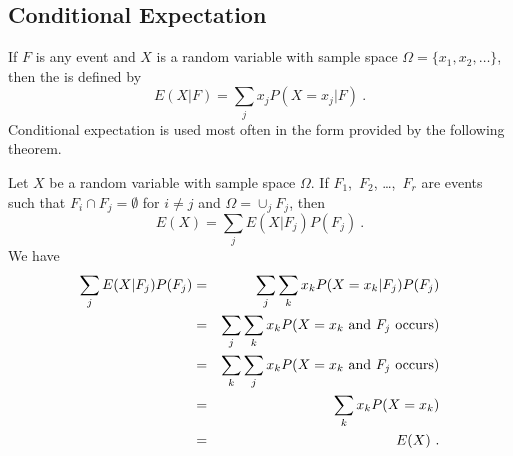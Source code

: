 \subsection*{Conditional Expectation}

\begin{definition}\label{def 6.3} If $F$ is any event and $X$ is a random variable
with sample space $\Omega = \{x_1, x_2,
\ldots\}$, then the   is
defined by
$$ E(X|F) = \sum_j x_j P(X = x_j|F)\ .
$$ Conditional expectation is used most often in the form provided by the following
theorem.
\end{definition}

\begin{theorem}\label{thm 6.5} Let $X$ be a random variable with sample space
$\Omega$.  If $F_1$,~$F_2$, \dots,~$F_r$ are events such that $F_i \cap F_j =
\emptyset$ for $i \ne j$ and $\Omega = \cup_j F_j$, then
$$ E(X) = \sum_j E(X|F_j) P(F_j)\ .
$$
\proof We have
\begin{eqnarray*}
\sum_j E(X|F_j) P(F_j) & = & \sum_j \sum_k x_k P(X = x_k|F_j) P(F_j) \\
                       & = & \sum_j \sum_k x_k P(X = x_k\,\, {\rm and}\,\, 
F_j\,\,{\rm occurs}) \\
                       & = & \sum_k \sum_j x_k P(X = x_k\,\,{\rm and}\,\,F_j\,\,{\rm
occurs})
\\
                       & = & \sum_k x_k P(X = x_k) \\
                       & = & E(X)\ .
\end{eqnarray*}
\end{theorem}

